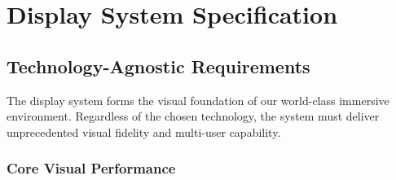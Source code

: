 \chapter{Display System Specification}

\section{Technology-Agnostic Requirements}

The display system forms the visual foundation of our world-class immersive environment. Regardless of the chosen technology, the system must deliver unprecedented visual fidelity and multi-user capability.

\subsection{Core Visual Performance}

